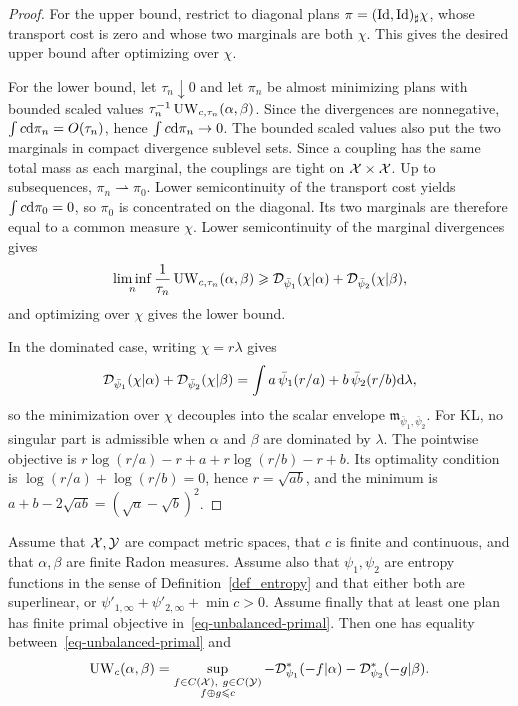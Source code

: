 \begin{proof}
	For the upper bound, restrict to diagonal plans $\pi=(\mathrm{Id},\mathrm{Id})_\sharp\chi$, whose transport cost is zero and whose two marginals are both $\chi$. This gives the desired upper bound after optimizing over $\chi$.

	For the lower bound, let $\tau_n\downarrow0$ and let $\pi_n$ be almost minimizing plans with bounded scaled values $\tau_n^{-1}\operatorname{UW}_{c,\tau_n}(\alpha,\beta)$. Since the divergences are nonnegative, $\int c\mathrm{d}\pi_n=O(\tau_n)$, hence $\int c\mathrm{d}\pi_n\to0$. The bounded scaled values also put the two marginals in compact divergence sublevel sets. Since a coupling has the same total mass as each marginal, the couplings are tight on $\mathcal{X}\times\mathcal{X}$. Up to subsequences, $\pi_n\rightharpoonup\pi_0$. Lower semicontinuity of the transport cost yields $\int c\mathrm{d}\pi_0=0$, so $\pi_0$ is concentrated on the diagonal. Its two marginals are therefore equal to a common measure $\chi$. Lower semicontinuity of the marginal divergences gives
	\[
		\liminf_n\frac1{\tau_n}\operatorname{UW}_{c,\tau_n}(\alpha,\beta)
		\geqslant
		\mathcal{D}_{\bar\psi_1}(\chi|\alpha)+\mathcal{D}_{\bar\psi_2}(\chi|\beta),
	\]
	and optimizing over $\chi$ gives the lower bound.

	In the dominated case, writing $\chi=r\lambda$ gives
	\[
		\mathcal{D}_{\bar\psi_1}(\chi|\alpha)+\mathcal{D}_{\bar\psi_2}(\chi|\beta)
		=
		\int
		a\,\bar\psi_1(r/a)+b\,\bar\psi_2(r/b)
		\mathrm{d}\lambda,
	\]
	so the minimization over $\chi$ decouples into the scalar envelope $\mathfrak m_{\bar\psi_1,\bar\psi_2}$. For KL, no singular part is admissible when $\alpha$ and $\beta$ are dominated by $\lambda$. The pointwise objective is $r\log(r/a)-r+a+r\log(r/b)-r+b$. Its optimality condition is $\log(r/a)+\log(r/b)=0$, hence $r=\sqrt{ab}$, and the minimum is $a+b-2\sqrt{ab}=(\sqrt a-\sqrt b)^2$.
\end{proof}

\begin{prop}\label{prop-dual-unbalanced-ot}
	Assume that $\mathcal{X},\mathcal{Y}$ are compact metric spaces, that $c$ is finite and continuous, and that $\alpha,\beta$ are finite Radon measures. Assume also that $\psi_1,\psi_2$ are entropy functions in the sense of Definition~\ref{def_entropy} and that either both are superlinear, or
	$\psi'_{1,\infty}+\psi'_{2,\infty}+\min c>0$.
	Assume finally that at least one plan has finite primal objective in~\eqref{eq-unbalanced-primal}.
	Then one has equality between~\eqref{eq-unbalanced-primal} and
	\[
		\operatorname{UW}_c(\alpha,\beta)
		=
		\sup_{\substack{f\in C(\mathcal{X}),\ g\in C(\mathcal{Y})\\ f\oplus g\leqslant c}}
		-
		\mathcal{D}_{\psi_1}^*(-f|\alpha)
		-
		\mathcal{D}_{\psi_2}^*(-g|\beta).
	\]
\end{prop}

